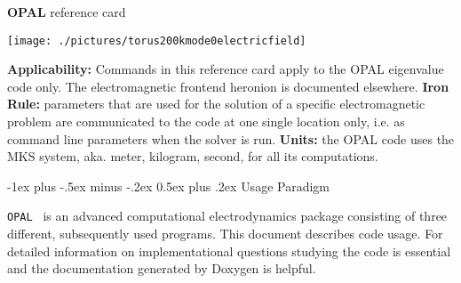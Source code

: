 \documentclass[10pt,landscape,a4paper]{article}
\makeatletter
\renewcommand{\section}{\@startsection{section}{1}{0mm}%
                                {-1ex plus -.5ex minus -.2ex}%
                                {0.5ex plus .2ex}%
                                {\normalfont\large\bfseries}}
\newcommand{\opal}{\textsc{OPAL }}
\makeatother
\begin{document}
\footnotesize
\begin{multicols}{3}


\setlength{\premulticols}{1pt}
\setlength{\postmulticols}{1pt}
\setlength{\multicolsep}{1pt}
\setlength{\columnsep}{2pt}





\begin{center}
     \LARGE{\large{\textbf{\textsf{\opal}}} reference card} \\
\end{center}


\begin{center}
  \texttt{[image: ./pictures/torus200kmode0electricfield]}
\end{center}









\textsf{\textbf{Applicability:}} Commands in this reference card
apply to the \textsf{\opal} eigenvalue code only. The electromagnetic
frontend \textsf{heronion} is documented elsewhere.
\textsf{\textbf{Iron Rule:}} parameters that are used for the solution of
a specific electromagnetic problem are communicated to the code
at one single location only, i.e. as command line parameters when
the solver is run.
\textsf{\textbf{Units:}} the \textsf{\opal} code uses the MKS system,
aka. meter, kilogram, second, for all its computations.



\section{\textsf{Usage Paradigm}}


\texttt{\opal} is an advanced computational electrodynamics package consisting of three different,
subsequently used programs.
This document describes code usage. For detailed information on implementational questions
studying the code is essential and the documentation generated by Doxygen is helpful.









\end{multicols}
\end{document}
